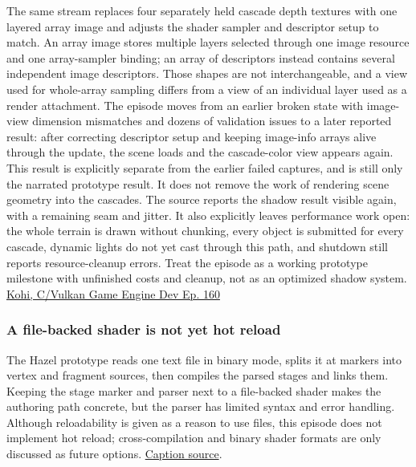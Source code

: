 The same stream replaces four separately held cascade depth textures with one layered array image and adjusts the shader sampler and descriptor setup to match. An array image stores multiple layers selected through one image resource and one array-sampler binding; an array of descriptors instead contains several independent image descriptors. Those shapes are not interchangeable, and a view used for whole-array sampling differs from a view of an individual layer used as a render attachment. The episode moves from an earlier broken state with image-view dimension mismatches and dozens of validation issues to a later reported result: after correcting descriptor setup and keeping image-info arrays alive through the update, the scene loads and the cascade-color view appears again. This result is explicitly separate from the earlier failed captures, and is still only the narrated prototype result. It does not remove the work of rendering scene geometry into the cascades. The source reports the shadow result visible again, with a remaining seam and jitter. It also explicitly leaves performance work open: the whole terrain is drawn without chunking, every object is submitted for every cascade, dynamic lights do not yet cast through this path, and shutdown still reports resource-cleanup errors. Treat the episode as a working prototype milestone with unfinished costs and cleanup, not as an optimized shadow system. \href{https://www.youtube.com/watch?v=Zcxl3BmmxJA}{Kohi, C/Vulkan Game Engine Dev Ep. 160}

\subsubsection{A file-backed shader is not yet hot reload}\label{06-engine-ii-ch026-a-file-backed-shader-is-not-yet-hot-reload}

\hypertarget{06-engine-ii-ch026-a-file-backed-shader-is-not-yet-hot-reload}{}

The Hazel prototype reads one text file in binary mode, splits it at  markers into vertex and fragment sources, then compiles the parsed stages and links them. Keeping the stage marker and parser next to a file-backed shader makes the authoring path concrete, but the parser has limited syntax and error handling. Although reloadability is given as a reason to use files, this episode does not implement hot reload; cross-compilation and binary shader formats are only discussed as future options. \href{https://www.youtube.com/watch?v=8wFEzIYRZXg}{Caption source}.

